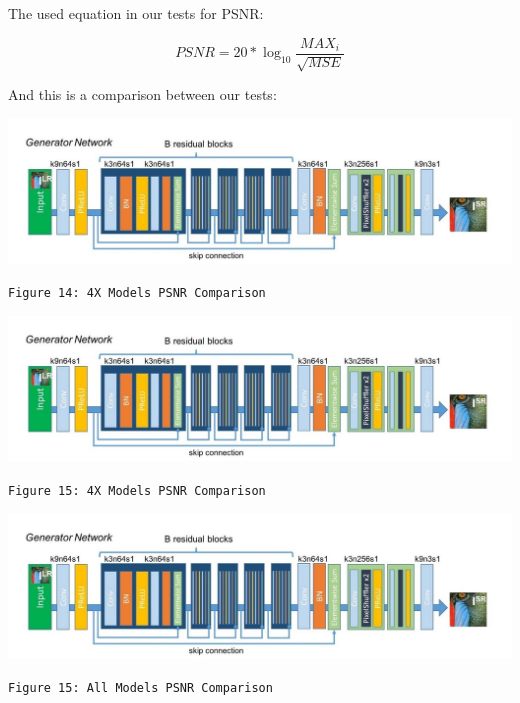 \documentclass[12pt]{article}
\begin{document}
				The used equation in our tests for PSNR:
				
				$$ PSNR = 20 * \log_{10}{\frac{MAX_i}{\sqrt{MSE}}} $$
				
				And this is a comparison between our tests:
				\begin{center}
					\vspace{0.1in}
					\includegraphics[width=6in]{Images/Generator.jpeg}
				
					\texttt{Figure 14: 4X Models PSNR Comparison}
					\vspace{0.1in}
				\end{center}
				\begin{center}
					\vspace{0.1in}
					\includegraphics[width=6in]{Images/Generator.jpeg}
				
					\texttt{Figure 15: 4X Models PSNR Comparison}
					\vspace{0.1in}
				\end{center}
				\begin{center}
					\vspace{0.1in}
					\includegraphics[width=6in]{Images/Generator.jpeg}
				
					\texttt{Figure 15: All Models PSNR Comparison}
					\vspace{0.1in}
				\end{center}
\end{document}

